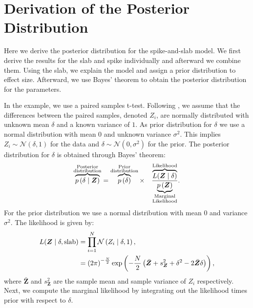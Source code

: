 \documentclass[a4paper]{article}
\newcommand{\DON}[1]{\todo[inline, color=white]{Don: #1}}
\newcommand{\shypo}[1]{%
	\ifnum#1>0%
		\mathrm{slab}
	\else%
		\mathrm{spike}
	\fi%
}
\newcommand{\model}{\mathcal{M}}
\newcommand{\data}{\mathrm{data}}%
\newcommand{\dataZ}	{\bm{Z}}
\newcommand{\dataZi}{Z_i}
\newcommand{\meanZ}	{\bar{\dataZ}}
\newcommand{\varZ}	{s_{\dataZ}^2}
\newcommand{\probp}[1]{p\left(#1\right)}
\newcommand{\lik}{L}
\newcommand{\dnorm}[2]{\mathcal{N}\left(#1, #2\right)}
\newcommand{\dnormc}[3]{\mathcal{N}\left(#1 \mid #2, #3\right)}
\newenvironment{revision}{\color{teal}}{\color{black}}
\begin{document}
\printbibliography

\newpage
\appendix
\begin{revision}%

\section*{Derivation of the Posterior Distribution}


Here we derive the posterior distribution for the spike-and-slab model. We first derive the results for the slab and spike individually and afterward we combine them. Using the slab, we explain the model and assign a prior distribution to effect size. Afterward, we use Bayes' theorem to obtain the posterior distribution for the parameters.

In the example, we use a paired samples t-test. Following \textcite{RouderEtAl2018PBR}, we assume that the differences between the paired samples, denoted $\dataZi$, are normally distributed with unknown mean $\delta$ and a known variance of $1$.
As prior distribution for $\delta$ we use a normal distribution with mean 0 and unknown variance $\sigma^2$.
This implies $\dataZi\sim \dnorm{\delta}{1}$ for the data and $\delta\sim\dnorm{0}{\sigma^2}$ for the prior. The posterior distribution for $\delta$ is obtained through Bayes' theorem:
\begin{align*}%
\overbrace{\probp{\delta \mid \dataZ}}^{\substack{\text{Posterior}\\\text{distribution}}}
= 
\overbrace{\probp{\delta}}^{\substack{\text{Prior}\\ \text{distribution}}}
\times \quad
\frac{
	\overbrace{\lik(\dataZ \mid \delta)}^{\text{Likelihood}}
}{
	\underbrace{\probp{\dataZ}}_{\substack{\text{Marginal}\\ \text{Likelihood}}}
}.
\end{align*}
For the prior distribution we use a normal distribution with mean 0 and variance $\sigma^2$. The likelihood is given by:
\begin{align*}
	\lik(\dataZ \mid \delta, \shypo{1}) &= \prod_{i=1}^{N} \dnormc{\dataZi}{\delta}{1},\\
							 &= \left(2\pi\right)^{-\frac{N}{2}}
							 \exp\left(-\frac{N}{2}\left(\meanZ + \varZ + \delta^2 -2\meanZ\delta\right)\right),
\end{align*}
where $\meanZ$ and $\varZ$ are the sample mean and sample variance of $\dataZi$ respectively. Next, we compute the marginal likelihood by integrating out the likelihood times prior with respect to $\delta$.


\end{revision}
\end{document}
